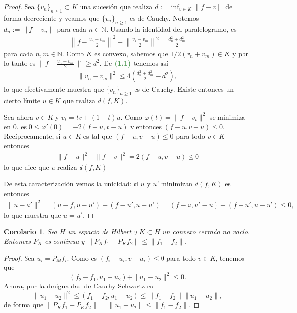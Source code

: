 \documentclass[11pt]{report}
\theoremstyle{colored}
\newtheorem{corollary}{Corolario}[section]
\newcommand{\N}{\mathbb{N}}
\newcommand{\ip}[1]{( #1 )}
\newcommand{\paint}[1]{\color{color}{#1}}
\newcommand{\tpaint}[1]{\paint{\textbf{#1}}}
\begin{document}
\begin{proof} Sea $\{v_n\}_{n \geq 1} \subset K$ una sucesión que realiza $d := \inf_{v \in K}\|f-v\|$ de forma decreciente y veamos que $\{v_n\}_{n \geq 1}$ es de Cauchy. Notemos $d_n := \|f-v_n\|$ para cada $n \in \N$. Usando la identidad del paralelogramo, es
\begin{align}
\left\|f-\frac{v_n+v_m}{2}\right\|^2 + \left\|\frac{v_n-v_m}{2}\right\|^2 = \frac{d_n^2 + d_m^2}{2}
\end{align}
para cada $n,m \in \N$. Como $K$ es convexo, sabemos que $1/2(v_n+v_m) \in K$ y por lo tanto  es $\|f-\frac{v_n+v_m}{2}\|^2 \geq d^2$. De $\tpaint{(1.1)}$ tenemos así 
\begin{align*}
\|v_n-v_m\|^2 \leq 4\left(\frac{d_n^2+d_m^2}{2}-d^2\right),
\end{align*}
lo que efectivamente muestra que $\{v_n\}_{n \geq 1}$ es de Cauchy. Existe entonces un cierto límite $u \in K$ que realiza $d(f,K)$. 

Sea ahora $v \in K$ y $v_t = tv + (1-t)u$. Como $\varphi(t) = \|f-v_t\|^2$ se minimiza en $0$, es $0  \leq \varphi'(0) = -2(f-u,v-u)$ y entonces $(f-u,v-u) \leq 0$. Recíprocamente, si $u \in K$ es tal que $(f-u, v-u) \leq 0$ para todo $v \in K$ entonces 
\begin{align}
\|f-u\|^2 -\|f-v\|^2 = 2(f-u,v-u) \leq 0
\end{align}
lo que dice que $u$ realiza $d(f,K)$.

De esta caracterización vemos la unicidad: si $u$ y $u'$ minimizan $d(f,K)$ es entonces
\begin{align*}
\|u-u'\|^2 = \ip{u-f,u-u'} + \ip{f-u',u-u'} = \ip{f-u,u'-u} + \ip{f-u',u-u'} \leq 0,
\end{align*}
lo que muestra que $u = u'$.
\end{proof}

\begin{corollary} Sea $H$ un espacio de Hilbert y $K \subset H$ un convexo cerrado no vacío. Entonces $P_K$ es continua y $\|P_Kf_1 - P_Kf_2\| \leq \|f_1 - f_2\|$.
\end{corollary}
\begin{proof} Sea $u_i = P_Mf_i$. Como es $(f_i - u_i,v-u_i) \leq 0$ para todo $v \in K$, tenemos que
\[
(f_2-f_1,u_1-u_2) + \|u_1-u_2\|^2 \leq 0.
\]
Ahora, por la desigualdad de Cauchy-Schwartz es
\[
\|u_1-u_2\|^2 \leq \ip{f_1-f_2,u_1-u_2} \leq \|f_1-f_2\|\|u_1-u_2\|,
\]
de forma que $\|P_Kf_1-P_Kf_2\| = \|u_1-u_2\| \leq \|f_1-f_2\|$.
\end{proof}
\end{document}
